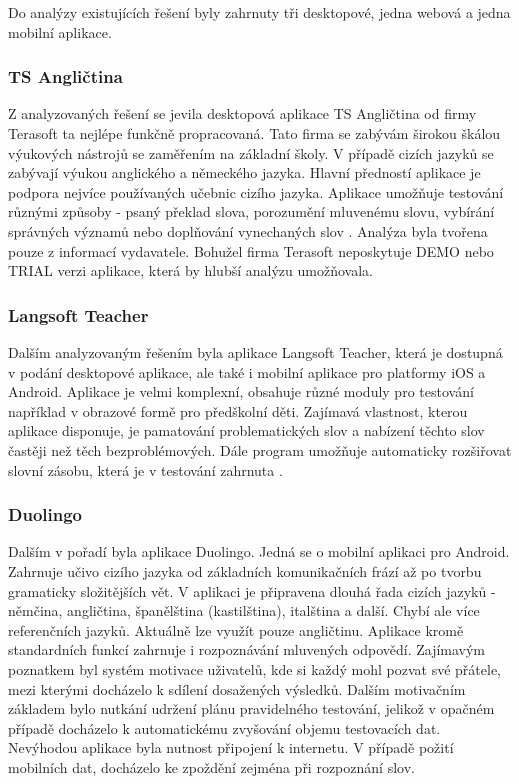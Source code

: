 \documentclass[a4paper,11pt,titlepage,fleqn]{article}
\begin{document}
        Do analýzy existujících řešení byly zahrnuty tři desktopové, jedna webová a jedna mobilní aplikace.

        \subsubsection{TS Angličtina}
            Z analyzovaných řešení se jevila desktopová aplikace TS Angličtina od firmy Terasoft ta nejlépe funkčně propracovaná. Tato firma se zabývám širokou škálou výukových nástrojů se zaměřením na základní školy. V případě cizích jazyků se zabývají výukou anglického a německého jazyka. Hlavní předností aplikace je podpora nejvíce používaných učebnic cizího jazyka. Aplikace umožňuje testování různými způsoby - psaný překlad slova, porozumění mluvenému slovu, vybírání správných významů nebo doplňování vynechaných slov \cite{bib:terasoft}. Analýza byla tvořena pouze z informací vydavatele. Bohužel firma Terasoft neposkytuje DEMO nebo TRIAL verzi aplikace, která by hlubší analýzu umožňovala.

        \subsubsection{Langsoft Teacher}
            Dalším analyzovaným řešením byla aplikace Langsoft Teacher, která je dostupná v podání desktopové aplikace, ale také i mobilní aplikace pro platformy iOS a Android. Aplikace je velmi komplexní, obsahuje různé moduly pro testování například v obrazové formě pro předškolní děti. Zajímavá vlastnost, kterou aplikace disponuje, je pamatování problematických slov a nabízení těchto slov častěji než těch bezproblémových. Dále program umožňuje automaticky rozšiřovat slovní zásobu, která je v testování zahrnuta \cite{bib:langsoft}.

        \subsubsection{Duolingo}
            Dalším v pořadí byla aplikace Duolingo. Jedná se o mobilní aplikaci pro Android. Zahrnuje učivo cizího jazyka od základních komunikačních frází až po tvorbu gramaticky složitějších vět. V aplikaci je připravena dlouhá řada cizích jazyků - němčina, angličtina, španělština (kastilština), italština a další. Chybí ale více referenčních jazyků. Aktuálně lze využít pouze angličtinu. Aplikace kromě standardních funkcí zahrnuje i rozpoznávání mluvených odpovědí. Zajímavým poznatkem byl systém motivace uživatelů, kde si každý mohl pozvat své přátele, mezi kterými docházelo k sdílení dosažených výsledků. Dalším motivačním základem bylo nutkání udržení plánu pravidelného testování, jelikož v opačném případě docházelo k automatickému zvyšování objemu testovacích dat. Nevýhodou aplikace byla nutnost připojení k internetu. V případě požití mobilních dat, docházelo ke zpoždění zejména při rozpoznání slov.
\end{document}
